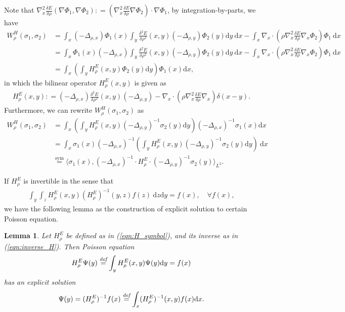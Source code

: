 \documentclass[11pt]{book}
\newtheorem{lemma}[theorem]{Lemma}
\begin{document}
Note that $\nabla_x^2\frac{\delta E}{\delta \rho}(\nabla\Phi_1,\nabla\Phi_2) : = \left(\nabla_x^2\frac{\delta E}{\delta \rho}\nabla\Phi_2\right)\cdot \nabla\Phi_1$, by integration-by-parts, we have
\begin{align*}
W_{\rho}^{H}(\sigma_1,\sigma_2) &= \int_x (-\Delta_{\rho,x})\Phi_1(x)  \int_y \frac{\delta^2E}{\delta\rho^2}(x,y)(-\Delta_{\rho,y})\Phi_2(y)\text{d}y\ \text{d}x - \int_x  \nabla_x\cdot\left(\rho\nabla_x^2\frac{\delta E}{\delta \rho}\nabla_x\Phi_2\right)\Phi_1\ \text{d}x\\
&= \int_x \Phi_1(x) (-\Delta_{\rho,x}) \int_y \frac{\delta^2E}{\delta\rho^2}(x,y)(-\Delta_{\rho,y})\Phi_2(y)\text{d}y\ \text{d}x - \int_x  \nabla_x\cdot\left(\rho\nabla_x^2\frac{\delta E}{\delta \rho}\nabla_x\Phi_2\right)\Phi_1\ \text{d}x\\
& = \int_x \left( \int_y H^E_{\rho}(x,y) \Phi_2(y)\text{d}y \right) \Phi_1(x) \text{d}x,
\end{align*}
in which the bilinear operator $H^E_{\rho}(x,y)$ is given as
\begin{align}
H^E_{\rho}(x,y): = (-\Delta_{\rho,x}) \frac{\delta^2E}{\delta\rho^2}(x,y)(-\Delta_{\rho,y}) - \nabla_x\cdot\left(\rho\nabla_x^2\frac{\delta E}{\delta \rho}\nabla_x\right)\delta(x-y).
\end{align}
Furthermore, we can rewrite $W_{\rho}^H(\sigma_1,\sigma_2)$ as
\begin{align}
W_{\rho}^{H}(\sigma_1,\sigma_2) &= \int_x \left( \int_y H^E_{\rho}(x,y) (-\Delta_{\rho,y})^{-1}\sigma_2(y)\text{d}y \right)  (-\Delta_{\rho,x})^{-1}\sigma_1(x) \text{d}x \nonumber\\
& = \int_x \sigma_1(x) (-\Delta_{\rho,x})^{-1} \left( \int_y H^E_{\rho}(x,y) (-\Delta_{\rho,y})^{-1}\sigma_2(y)\text{d}y \right)  \ \text{d}x  \nonumber\\
& \stackrel{\text{sym}}{=} \Big\langle \sigma_1(x), (-\Delta_{\rho,x})^{-1}\cdot H_{\rho}^E \cdot(-\Delta_{\rho,y})^{-1}\sigma_2(y) \Big\rangle_{L^2}. \label{eqn:H_symbol}
\end{align}

If $H^E_{\rho}$ is invertible in the sense that 
\begin{align}\label{eqn:inverse_H}
\int_y \int_z H^E_{\rho}(x,y) (H^E_{\rho})^{-1}(y,z)f(z) \ \text{d}z\text{d}y = f(x), \quad \forall f(x),
\end{align}
we have the following lemma as the construction of explicit solution to certain Poisson equation.

\begin{lemma}
Let $H^E_{\rho}$ be defined as in (\ref{eqn:H_symbol}), and its inverse as in (\ref{eqn:inverse_H}). Then Poisson equation
\begin{align}
H_{\rho}^E \Psi(y)\stackrel{\emph{def}}{=} \int_y H_{\rho}^E(x,y)\Psi(y) \text{d}y =   f(x)
\end{align}
has an explicit solution
\begin{align}
\Psi(y) = (H_{\rho}^E)^{-1}f(x) \stackrel{\emph{def}}{=} \int_{x} (H_{\rho}^E)^{-1}(x,y) f(x) \text{d}x.
\end{align}
\end{lemma}
\end{document}
